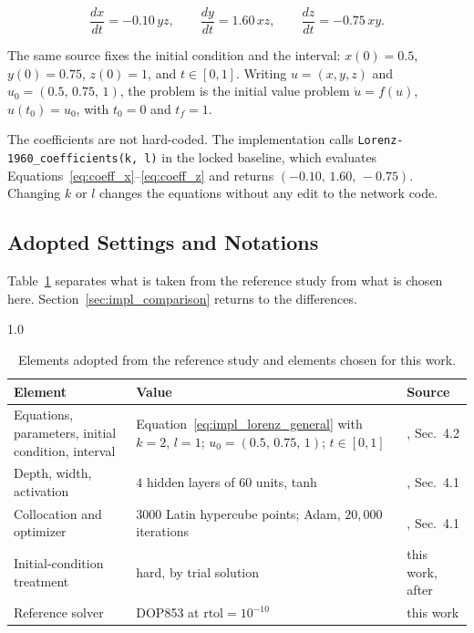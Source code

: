 \begin{equation}
\frac{dx}{dt} = -0.10\,yz, \qquad
\frac{dy}{dt} = 1.60\,xz, \qquad
\frac{dz}{dt} = -0.75\,xy.
\label{eq:impl_lorenz_reduced}
\end{equation}

The same source fixes the initial condition and the interval: $x(0) = 0.5$, $y(0) = 0.75$, $z(0) = 1$, and $t \in [0, 1]$. Writing $u = (x, y, z)$ and $u_0 = (0.5,\, 0.75,\, 1)$, the problem is the initial value problem $\dot{u} = f(u)$, $u(t_0) = u_0$, with $t_0 = 0$ and $t_f = 1$.

The coefficients are not hard-coded. The implementation calls \texttt{Lorenz-1960\_\allowbreak coefficients(k,\,l)} in the locked baseline, which evaluates Equations~\ref{eq:coeff_x}--\ref{eq:coeff_z} and returns $(-0.10,\, 1.60,\, -0.75)$. Changing $k$ or $l$ changes the equations without any edit to the network code.

\subsection{Adopted Settings and Notations}

Table~\ref{tab:adopted} separates what is taken from the reference study from what is chosen here. Section~\ref{sec:impl_comparison} returns to the differences.

\begin{table}[H]
\centering
\caption{Elements adopted from the reference study and elements chosen for this work.}
\label{tab:adopted}
\begin{spacing}{1.0}
\small
\begin{tabularx}{\textwidth}{|p{4.0cm}|>{\raggedright\arraybackslash}X|p{3.0cm}|}
\hline
\textbf{Element} & \textbf{Value} & \textbf{Source} \\
\hline
Equations, parameters, initial condition, interval & Equation~\ref{eq:impl_lorenz_general} with $k = 2$, $l = 1$; $u_0 = (0.5,\, 0.75,\, 1)$; $t \in [0, 1]$ & \cite{matthews2024pinnde}, Sec.~4.2 \\
\hline
Depth, width, activation & $4$ hidden layers of $60$ units, tanh & \cite{matthews2024pinnde}, Sec.~4.1 \\
\hline
Collocation and optimizer & $3000$ Latin hypercube points; Adam, $20{,}000$ iterations & \cite{matthews2024pinnde}, Sec.~4.1 \\
\hline
Initial-condition treatment & hard, by trial solution & this work, after \cite{lagaris1998ann} \\
\hline
Reference solver & DOP853 at $\text{rtol}=10^{-10}$ & this work \\
\hline
\end{tabularx}
\end{spacing}
\end{table}


